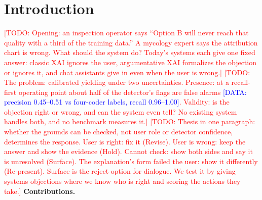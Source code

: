 \documentclass[preprint,12pt,3p,times]{elsarticle}
\newcommand{\todo}[1]{\textcolor{red}{[TODO: #1]}}
\newcommand{\done}[1]{\textcolor{blue}{[DATA: #1]}}   %
\begin{document}
\section{Introduction}
\todo{Opening: an inspection operator says ``Option B will never reach that quality with a third of the training data.'' A mycology expert says the attribution chart is wrong. What should the system do? Today's systems each give one fixed answer: classic XAI ignores the user, argumentative XAI formalizes the objection or ignores it, and chat assistants give in even when the user is wrong.}
\todo{The problem: calibrated yielding under two uncertainties. Presence: at a recall-first operating point about half of the detector's flags are false alarms \done{precision 0.45--0.51 vs four-coder labels, recall 0.96--1.00}. Validity: is the objection right or wrong, and can the system even tell? No existing system handles both, and no benchmark measures it.}
\todo{Thesis in one paragraph: whether the grounds can be checked, not user role or detector confidence, determines the response. User is right: fix it (Revise). User is wrong: keep the answer and show the evidence (Hold). Cannot check: show both sides and say it is unresolved (Surface). The explanation's form failed the user: show it differently (Re-present). Surface is the reject option for dialogue. We test it by giving systems objections where we know who is right and scoring the actions they take.}
\textbf{Contributions.}
\end{document}
